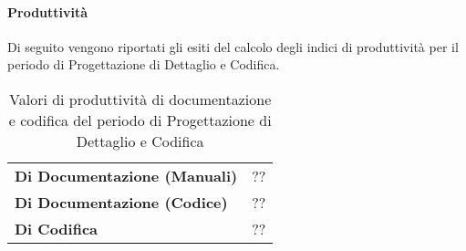\paragraph*{Produttività}
Di seguito vengono riportati gli esiti del calcolo degli indici di produttività per il periodo di Progettazione di Dettaglio e Codifica.
\begin{table}[H]
\centering
\begin{tabular}{|l|l|}
\cline{1-2}
\textbf{Di Documentazione (Manuali)} & ?? \\ \cline{1-2} %
\textbf{Di Documentazione (Codice)} & ?? \\ \cline{1-2} %
\textbf{Di Codifica} & ?? \\ \cline{1-2} %
\end{tabular}
\caption{Valori di produttività di documentazione e codifica del periodo di Progettazione di Dettaglio e Codifica}
\end{table}
